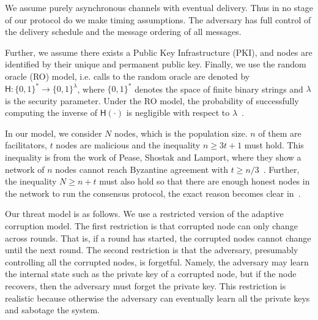 We assume purely asynchronous channels with eventual delivery.
Thus in no stage of our protocol do we make timing assumptions.
The adversary has full control of the delivery schedule and the message ordering of all messages.

Further, we assume there exists a Public Key Infrastructure (PKI), and nodes are identified by their unique and permanent public key.
Finally, we use the random oracle (RO) model, i.e. calls to the random oracle are denoted by $\textsf{H}: \{0, 1\}^* \rightarrow \{0, 1\}^\lambda$,
where $\{0, 1\}^*$ denotes the space of finite binary strings and $\lambda$ is the security parameter.
Under the RO model, the probability of successfully computing the inverse of $\textsf{H}(\cdot)$ is negligible with respect to $\lambda$~\cite{bellare1993random}.

In our model, we consider $N$ nodes, which is the population size.
$n$ of them are facilitators, $t$ nodes are malicious and the inequality
$n \ge 3t + 1$ must hold.
This inequality is from the work of Pease, Shostak and Lamport, where they show a network of $n$ nodes cannot reach Byzantine agreement with $t \ge n/3$~\cite{pease1980reaching}.
Further, the inequality $N \ge n + t$ must also hold so that there are enough honest nodes in the network to run the consensus protocol,
the exact reason becomes clear in~.

Our threat model is as follows. 
We use a restricted version of the adaptive corruption model.
The first restriction is that corrupted node can only change across rounds.
That is, if a round has started, the corrupted nodes cannot change until the next round.
The second restriction is that the adversary, presumably controlling all the corrupted nodes, is forgetful.
Namely, the adversary may learn the internal state such as the private key of a corrupted node,
but if the node recovers, then the adversary must forget the private key.
This restriction is realistic because otherwise the adversary can eventually learn all the private keys and sabotage the system.

